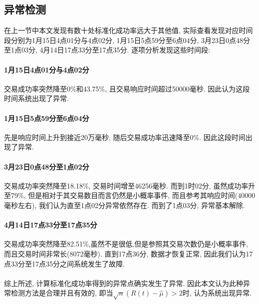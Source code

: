 \subsection{异常检测}

在上一节中本文发现有数十处标准化成功率远大于其他值, 实际查看发现对应时间段分别为1月15日4点01分与4点02分, 1月15日5点59分至6点04分, 3月23日0点48分至1点03分, 4月14日17点33分至17点35分. 逐项分析发现这些时间段:

\paragraph{1月15日4点01分与4点02分} 交易成功率突然降至0\%和43.75\%, 且交易响应时间超过50000毫秒. 因此认为这段时间系统出现了异常.

\paragraph{1月15日5点59分至6点04分} 先是响应时间上升到接近20万毫秒, 随后交易成功率迅速降至0\%. 因此这段时间出现了异常.

\paragraph{3月23日0点48分至1点02分} 交易成功率突然降至18.18\%, 交易时间增至46256毫秒. 而到1时02分, 虽然成功率升至79\%, 但是相对于其交易数目而言仍然是小概率事件, 而且参考其响应时间(40000毫秒左右), 我们认为直至1点02分异常依然存在. 而到了1点03分, 异常基本解除.

\paragraph{4月14日17点33分至17点35分} 交易成功率突然降至82.51\%,虽然不是很低,但是参照其交易次数仍是小概率事件, 而且交易时间非常长(8072毫秒). 直到17点36分, 数据才恢复正常, 因此我们认为17点33分至17点35分之间系统发生了故障.

\paragraph{\quad}综上所述, 计算标准化成功率得到的异常点确实发生了异常. 因此本文认为此种异常检测方法是合理并且有效的, 即当$\sqrt{n}(R(t)-\hat{\mu})>2$时, 认为系统出现异常.
